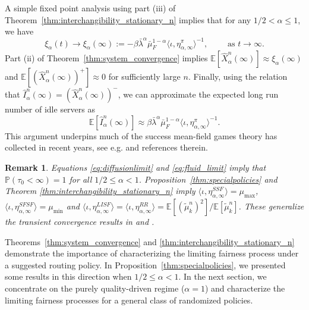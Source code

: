 \documentclass[a4paper,11pt,twoside]{article}
\numberwithin{equation}{section}
\numberwithin{figure}{section}
\theoremstyle{plain}
\newtheorem{remark}[theorem]{Remark}
\newcommand{\EE}{\mathbb{E}}
\newcommand{\PP}{\mathbb{P}}
\newcommand{\1}{\mathbbm{1}}
\begin{document}
A simple fixed point analysis using part (iii) of Theorem~\ref{thm:interchangibility_stationary_n} implies that for any $1/2<\alpha\leq 1$, 
we have $$\xi_{\alpha}(t)\to \xi_\alpha(\infty):=-\beta\bar{\lambda}^\alpha\bar{\mu}_F^{1-\alpha}\langle \iota, \eta_{\alpha,\infty}^\pi \rangle^{-1},\qquad \textrm{ as $t\to \infty$.}$$ Part (ii) of Theorem~\ref{thm:system_convergence} implies $ \EE[\hat{X}_\alpha^n(\infty)]\approx \xi_\alpha(\infty)$ and $\EE[(\hat{X}_\alpha^n(\infty))^+]\approx 0$ for sufficiently large $n$. Finally, using the relation that $\hat{I}^n_\alpha(\infty)=(\hat{X}_\alpha^n(\infty))^-$, we can approximate the expected long run number of idle servers as 
\begin{equation}
    \EE[\hat{I}_\alpha^n(\infty)]\approx\beta\bar{\lambda}^\alpha\bar{\mu}_F^{1-\alpha}\langle \iota, \eta_{\alpha,\infty}^\pi\rangle^{-1}.\label{eq:stationary_idle_length}
\end{equation}
This argument underpins much of the success mean-field games theory has collected in recent years, see e.g. \cite{Bayraktar2019} and references therein. 


\begin{remark}\label{rem:specialpolicies}
Equations \eqref{eq:diffusionlimit} and \eqref{eq:fluid_limit} imply that $\PP(\tau_0<\infty)=1$ for all $1/2\leq \alpha< 1$. Proposition~\ref{thm:specialpolicies} and Theorem \ref{thm:interchangibility_stationary_n} imply
$\langle\iota,\eta_{\alpha,\infty}^{SSF}\rangle = \mu_{\max}$, $
     \langle\iota,\eta_{\alpha,\infty}^{S
     FSF}\rangle= \mu_{\min}$ and $\langle\iota,\eta_{\alpha,\infty}^{LISF}\rangle=\langle\iota,\eta_{\alpha,\infty}^{RR}\rangle=
     \EE[(\tilde{\mu}_k^n)^2]/\EE[\tilde{\mu}_k^n]$. These generalize the transient convergence results in \cite{Atar2008} and \cite{bukeqin2019}.
\end{remark}

Theorems~\ref{thm:system_convergence} and \ref{thm:interchangibility_stationary_n} demonstrate the importance of characterizing the limiting fairness process under a suggested routing policy. In Proposition~\ref{thm:specialpolicies}, we presented some results in this direction when $1/2\leq \alpha<1$. In the next section, we concentrate on the purely quality-driven regime ($\alpha = 1$) and characterize the limiting fairness processes for a general class of randomized policies.  
 
\end{document}
